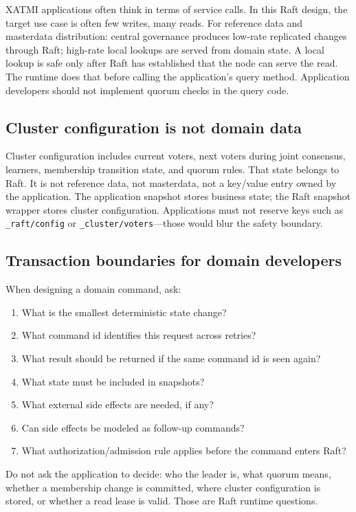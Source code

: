 XATMI applications often think in terms of service calls. In this Raft
design, the target use case is often few writes, many reads. For
reference data and masterdata distribution: central governance produces
low-rate replicated changes through Raft; high-rate local lookups are
served from domain state. A local lookup is safe only after Raft has
established that the node can serve the read. The runtime does that before
calling the application's query method. Application developers should not
implement quorum checks in the query code.

\subsection{Cluster configuration is not domain data}

Cluster configuration includes current voters, next voters during joint
consensus, learners, membership transition state, and quorum rules. That
state belongs to Raft. It is not reference data, not masterdata, not a
key/value entry owned by the application. The application snapshot stores
business state; the Raft snapshot wrapper stores cluster configuration.
Applications must not reserve keys such as \texttt{\_raft/config} or
\texttt{\_cluster/voters}---those would blur the safety boundary.

\subsection{Transaction boundaries for domain developers}

When designing a domain command, ask:

\begin{enumerate}
\item What is the smallest deterministic state change?
\item What command id identifies this request across retries?
\item What result should be returned if the same command id is seen again?
\item What state must be included in snapshots?
\item What external side effects are needed, if any?
\item Can side effects be modeled as follow-up commands?
\item What authorization/admission rule applies before the command enters
Raft?
\end{enumerate}

Do not ask the application to decide: who the leader is, what quorum
means, whether a membership change is committed, where cluster
configuration is stored, or whether a read lease is valid. Those are Raft
runtime questions.

